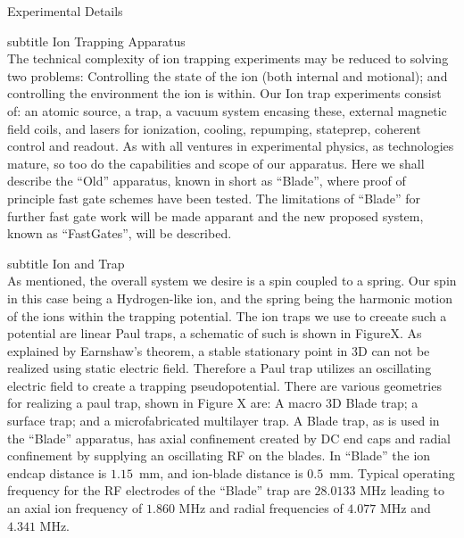 \documentclass{article}
\begin{document}

Experimental Details


subtitle Ion Trapping Apparatus\\

The technical complexity of ion trapping experiments may be reduced to
solving two problems: Controlling the state of the ion (both internal
and motional); and controlling the environment the ion is within.
Our Ion trap experiments consist of: an atomic source, a trap, a
vacuum system encasing these, external magnetic field coils, and
lasers for ionization, cooling, repumping, stateprep, coherent
control and readout.
As with all ventures in experimental physics, as technologies mature, so
too do the capabilities and scope of our apparatus.  Here we shall
describe the ``Old'' apparatus, known in short as ``Blade'', where
proof of principle fast gate schemes have been tested. The limitations
of ``Blade'' for further fast gate work will be made apparant and
the new proposed system, known as ``FastGates'', will be described. 

subtitle Ion and Trap\\

As mentioned, the overall system we desire is a spin coupled to a
spring. Our spin in this case being a Hydrogen-like ion, and the
spring being the harmonic motion of the ions within the trapping
potential. The ion traps we use to creeate such a potential are linear
Paul traps, a schematic of such is shown in FigureX. As explained by
Earnshaw's theorem, a stable stationary point in 3D can not be
realized using static electric field. Therefore a Paul trap utilizes
an oscillating electric field to create a trapping
pseudopotential. There are various geometries for realizing a paul
trap, shown in Figure X are: A macro 3D Blade trap; a surface trap;
and a microfabricated multilayer trap.  A Blade trap, as is used in
the ``Blade'' apparatus, has axial confinement created by DC end caps
and radial confinement by supplying an oscillating RF on the blades.
In ``Blade'' the ion endcap distance is $1.15$~mm, and ion-blade
distance is $0.5$~mm. Typical operating frequency for the RF
electrodes of the ``Blade'' trap are $28.0133$ MHz leading to an axial
ion frequency of $1.860$ MHz and radial frequencies of $4.077$ MHz and
$4.341$ MHz.
\end{document}
